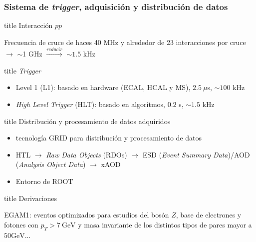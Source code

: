 \documentclass[10pt, compress,spanish]{beamer}
\begin{document}
\begin{frame}[fragile]
\frametitle{Sistema de \textit{trigger}, adquisición y distribución de datos}

\small

\vspace{0.5cm}

\begin{beamercolorbox}[leftskip=\titlelf]{title}
\normalsize Interacción $pp$
\end{beamercolorbox}
Frecuencia de cruce de haces 40 MHz y alrededor de 23 interacciones por cruce $\longrightarrow$ $\sim$1 GHz $\xrightarrow{reducir}$ $\sim 1.5$ kHz



\begin{beamercolorbox}[leftskip=\titlelf]{title}
\normalsize \textit{Trigger}
\end{beamercolorbox}
\begin{itemize}

  \item Level 1 (L1): basado en hardware (ECAL, HCAL y MS), $2.5 \:\mu$s, $\sim 100$ kHz

  \item \textit{High Level Trigger} (HLT): basado en algoritmos, $0.2$ s, $\sim 1.5$ kHz

\end{itemize}


\begin{beamercolorbox}[leftskip=\titlelf]{title}
\normalsize Distribución y procesamiento de datos adquiridos
\end{beamercolorbox}
\begin{itemize}

  \item tecnología GRID para distribución y procesamiento de datos

  \item HTL $\longrightarrow$ \textit{Raw Data Objects} (RDOs) $\longrightarrow$ ESD (\textit{Event Summary Data})/AOD (\textit{Analysis Object Data}) $\longrightarrow$ xAOD

  \item Entorno de ROOT

\end{itemize}


\begin{beamercolorbox}[leftskip=\titlelf]{title}
\normalsize Derivaciones
\end{beamercolorbox}
EGAM1: eventos optimizados para estudios del bosón $Z$, base de electrones y fotones con $p_{T} > 7 \:\text{GeV}$ y masa invariante de los distintos tipos de pares mayor a $50 \text{GeV}$...

\end{frame}
\end{document}
